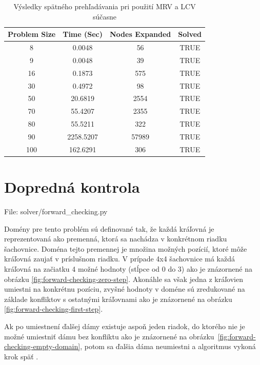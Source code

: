 \begin{table}[h!]
  \centering
  \begin{tabular}{|c|c|c|c|}
    \hline
    \textbf{Problem Size} & \textbf{Time (Sec)} & \textbf{Nodes Expanded} & \textbf{Solved} \\
    \hline
    8   & 0.0048 & 56    & TRUE \\
    9   & 0.0048 & 39    & TRUE \\
    16  & 0.1873 & 575   & TRUE \\
    30  & 0.4972 & 98    & TRUE \\
    50  & 20.6819 & 2554  & TRUE \\
    70  & 55.4207 & 2355  & TRUE \\
    80  & 55.5211 & 322   & TRUE \\
    90  & 2258.5207 & 57989 & TRUE \\
    100 & 162.6291 & 306   & TRUE \\
    \hline
  \end{tabular}
  \caption{Výsledky spätného prehľadávania pri použití MRV a LCV súčasne}
  \label{tab:backtracing_extended_results}
\end{table}

\section*{Dopredná kontrola}
File: solver/forward\_checking.py\par

Domény pre tento problém sú definované tak, že každá kráľovná je reprezentovaná ako premenná, ktorá sa nachádza v konkrétnom riadku šachovnice. Doména tejto premennej je množina možných pozícií, ktoré môže kráľovná zaujať v príslušnom riadku. V prípade 4x4 šachovnice má každá kráľovná na začiatku 4 možné hodnoty (stĺpce od 0 do 3) ako je znázornené na obrázku \ref{fig:forward-checking-zero-step}. Akonáhle sa však jedna z kráľovien umiestni na konkrétnu pozíciu, zvyšné hodnoty v doméne sú zredukované na základe konfliktov s ostatnými kráľovnami ako je znázornené na obrázku \ref{fig:forward-checking-first-step}.\par

Ak po umiestnení ďalšej dámy existuje aspoň jeden riadok, do ktorého nie je možné umiestniť dámu bez konfliktu ako je znázornené na obrázku~\ref{fig:forward-checking-empty-domain}, potom sa ďalšia dáma neumiestni a algoritmus vykoná krok späť .


